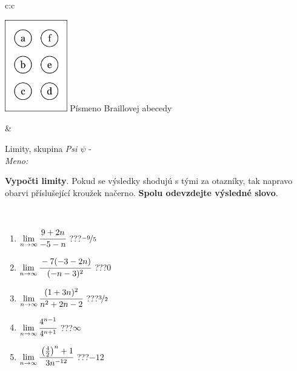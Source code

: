 \documentclass[10pt]{report}
\begin{document}
\begin{tabular}{c:c}
\begin{minipage}[c][104.5mm][t]{0.5\linewidth}
\begin{center}
\begin{minipage}{0.20\linewidth}
\begin{center}
\includegraphics[height=40mm]{../images/braille.png}
{\small Písmeno Braillovej abecedy}
\end{center}
\end{minipage}
\end{center}
\end{minipage}
&
\begin{minipage}[c][104.5mm][t]{0.5\linewidth}
\begin{center}
\vspace{7mm}
{\huge Limity, skupina \textit{Psi $\psi$} -}\\[5mm]
\textit{Meno:}\phantom{xxxxxxxxxxxxxxxxxxxxxxxxxxxxxxxxxxxxxxxxxxxxxxxxxxxxxxxxxxxxxxxxx}\\[5mm]
\begin{minipage}{0.95\linewidth}
\begin{center}
\textbf{Vypočti limity}. Pokud se výsledky shodujú s tými za otazníky, tak napravo\\obarvi příslušející kroužek načerno. \textbf{Spolu odevzdejte výsledné slovo}.
\end{center}
\end{minipage}
\\[1mm]
\begin{minipage}{0.79\linewidth}
\begin{center}
\begin{varwidth}{\linewidth}
\begin{enumerate}
\normalsize
\item $\lim\limits_{n\to\infty}\cfrac{9+2n}{-5-n}$\quad \dotfill\; ???\;\dotfill \quad $\nicefrac{-9}{5}$
\item $\lim\limits_{n\to\infty}\cfrac{-7(-3-2n)}{(-n-3)^2}$\quad \dotfill\; ???\;\dotfill \quad $0$
\item $\lim\limits_{n\to\infty}\cfrac{(1+3n)^2}{n^2+2n-2}$\quad \dotfill\; ???\;\dotfill \quad $\nicefrac{3}{2}$
\item $\lim\limits_{n\to\infty}\cfrac{4^{n-1}}{4^{n+1}}$\quad \dotfill\; ???\;\dotfill \quad $\infty$
\item $\lim\limits_{n\to\infty}\cfrac{\left(\frac{4}{2}\right)^n +1}{3n^{-12}}$\quad \dotfill\; ???\;\dotfill \quad $-12$

\end{enumerate}
\end{varwidth}
\end{center}
\end{minipage}
\end{center}
\end{minipage}
\end{tabular}
\end{document}
